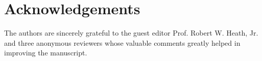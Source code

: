 \documentclass[journal,10pt]{IEEEtran}
\begin{document}
	\color{black}
	\section*{Acknowledgements}
	The authors are sincerely grateful to the guest editor Prof. Robert W. Heath, Jr. and three anonymous reviewers whose valuable comments greatly helped in improving the manuscript.
	
	\color{black}
	\balance
	
	
	
\end{document}
